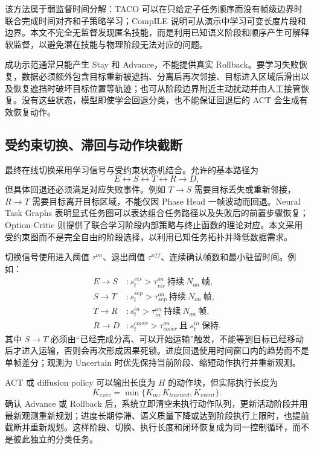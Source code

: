 \documentclass[UTF8,a4paper,11pt]{ctexart}
\begin{document}
该方法属于弱监督时间分解：TACO 可以在只给定子任务顺序而没有帧级边界时联合完成时间对齐和子策略学习\cite{shiarlis2018taco}；CompILE 说明可从演示中学习可变长度片段和边界\cite{kipf2019compile}。本文不完全无监督发现匿名技能，而是利用已知语义阶段和顺序产生可解释软监督，以避免潜在技能与物理阶段无法对应的问题。

成功示范通常只能产生 Stay 和 Advance，不能提供真实 Rollback。要学习失败恢复，数据必须额外包含目标重新被遮挡、分离后再次邻接、目标进入区域后滑出以及恢复遮挡时破坏目标位置等轨迹；也可从阶段边界附近主动扰动并由人工接管恢复。没有这些状态，模型即使学会回退分类，也不能保证回退后的 ACT 会生成有效恢复动作。

\subsection{受约束切换、滞回与动作块截断}

最终在线切换采用学习信号与受约束状态机结合。允许的基本路径为
\begin{equation}
E\leftrightarrow S\leftrightarrow T\leftrightarrow R\rightarrow D,
\end{equation}
但具体回退还必须满足对应失败事件。例如 $T\rightarrow S$ 需要目标丢失或重新邻接，$R\rightarrow T$ 需要目标离开目标区域，不能仅因 Phase Head 一帧波动而回退。Neural Task Graphs 表明显式任务图可以表达组合任务路径以及失败后的前置步骤恢复\cite{huang2019ntg}；Option-Critic 则提供了联合学习阶段内部策略与终止函数的理论对应\cite{bacon2017optioncritic}。本文采用受约束图而不是完全自由的阶段选择，以利用已知任务拓扑并降低数据需求。

切换信号使用进入阈值 $\tau^{on}$、退出阈值 $\tau^{off}$、连续确认帧数和最小驻留时间。例如：
\begin{align}
E\rightarrow S &: s_t^{vis}>\tau_{vis}^{on}\ \text{持续}\ N_{on}\ \text{帧},\\
S\rightarrow T &: s_t^{sep}>\tau_{sep}^{on}\ \text{持续}\ N_{on}\ \text{帧},\\
T\rightarrow R &: s_t^{in}>\tau_{in}^{on}\ \text{持续}\ N_{on}\ \text{帧},\\
R\rightarrow D &: s_t^{cover}>\tau_{cover}^{on}\ \text{且}\ s_t^{in}\ \text{保持}.
\end{align}
其中 $S\rightarrow T$ 必须由“已经完成分离、可以开始运输”触发，不能等到目标已经移动后才进入运输，否则会再次形成因果死锁。进度回退使用时间窗口内的趋势而不是单帧差分；观测为 Uncertain 时优先保持当前阶段、缩短动作执行并重新观测。

ACT 或 diffusion policy 可以输出长度为 $H$ 的动作块，但实际执行长度为
\begin{equation}
K_{exec}=\min\{K_m,K_{learned},K_{event}\}.
\end{equation}
确认 Advance 或 Rollback 后，系统立即清空未执行动作队列，更新活动阶段并用最新观测重新规划；进度长期停滞、语义质量下降或达到阶段执行上限时，也提前截断并重新规划。这样阶段、切换、执行长度和闭环恢复成为同一控制循环，而不是彼此独立的分类任务。
\end{document}
